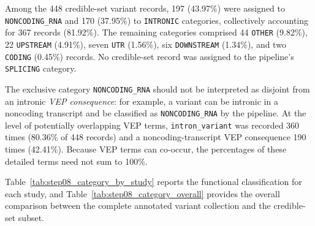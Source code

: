 \documentclass[11pt,a4paper]{article}
\begin{document}
Among the 448 credible-set variant records, 197
(43.97\%) were assigned to \texttt{NONCODING\_RNA}
and 170 (37.95\%) to \texttt{INTRONIC} categories,
collectively accounting for 367 records (81.92\%).
The remaining categories comprised 44 \texttt{OTHER}
(9.82\%), 22 \texttt{UPSTREAM} (4.91\%), seven
\texttt{UTR} (1.56\%), six \texttt{DOWNSTREAM}
(1.34\%), and two \texttt{CODING} (0.45\%) records.
No credible-set record was assigned to the pipeline's
\texttt{SPLICING} category.

The exclusive category \texttt{NONCODING\_RNA}
should not be interpreted as disjoint from an intronic
\emph{VEP consequence}: for example, a variant can be
intronic in a noncoding transcript and be classified as
\texttt{NONCODING\_RNA} by the pipeline. At the level
of potentially overlapping VEP terms, \texttt{intron\_variant}
was recorded 360 times (80.36\% of 448 records) and
a noncoding-transcript VEP consequence 190 times
(42.41\%). Because VEP terms can co-occur, the
percentages of these detailed terms need not sum to 100\%.

Table~\ref{tab:step08_category_by_study} reports the
functional classification for each study, and
Table~\ref{tab:step08_category_overall} provides the
overall comparison between the complete annotated
variant collection and the credible-set subset.

\begin{table}[htbp]
\centering
\scriptsize
\setlength{\tabcolsep}{3pt}
\caption{Functional categories of 95\% credible-set variant
records within each GWAS. Categories are mutually exclusive
by the Step~08 classification procedure; zero denotes no
record assigned to that category. NC RNA, noncoding RNA.}
\label{tab:step08_category_by_study}
\end{table}
\end{document}

